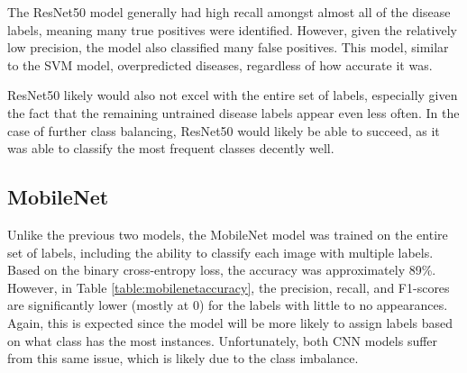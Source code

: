 \documentclass{article}
\theoremstyle{plain}
\theoremstyle{definition}
\theoremstyle{remark}
\begin{document}
\begin{table}[!h]
    \centering
    \caption{The precision, recall, F1-scores, and support of the ResNet50 model, where support is
    the number of examples/diseases in the set.}
    \label{table:resnet50accuracy}
\end{table}

The ResNet50 model generally had high recall amongst almost all of the disease labels, meaning many
true positives were identified. However, given the relatively low precision, the model also
classified many false positives. This model, similar to the SVM model, overpredicted diseases,
regardless of how accurate it was.

ResNet50 likely would also not excel with the entire set of labels, especially given the fact
that the remaining untrained disease labels appear even less often. In the case of further class
balancing, ResNet50 would likely be able to succeed, as it was able to classify the most frequent
classes decently well.

\subsection{MobileNet}
\label{section:resultmobilenet}
Unlike the previous two models, the MobileNet model was trained on the entire set of labels,
including the ability to classify each image with multiple labels. Based on the binary cross-entropy
loss, the accuracy was approximately 89\%. However, in Table \ref{table:mobilenetaccuracy}, the
precision, recall, and F1-scores are significantly lower (mostly at 0) for the labels with little
to no appearances. Again, this is expected since the model will be more likely to assign labels
based on what class has the most instances. Unfortunately, both CNN models suffer from this same
issue, which is likely due to the class imbalance. 
\end{document}
